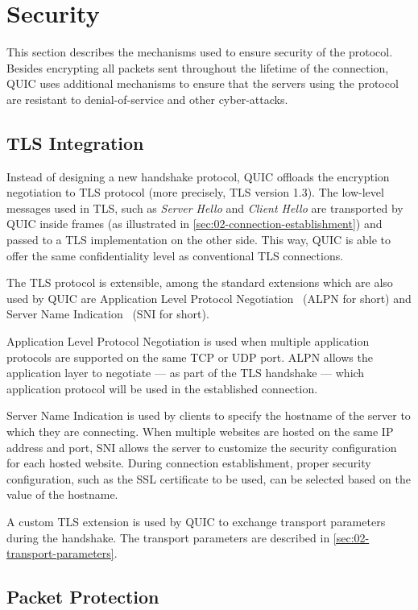 \section{Security}

This section describes the mechanisms used to ensure security of the protocol. Besides encrypting
all packets sent throughout the lifetime of the connection, QUIC uses additional mechanisms to
ensure that the servers using the protocol are resistant to denial-of-service and other
cyber-attacks.

\subsection{TLS Integration}

Instead of designing a new handshake protocol, QUIC offloads the encryption negotiation to TLS
protocol (more precisely, TLS version 1.3). The low-level messages used in TLS, such as
\textit{Server Hello} and \textit{Client Hello} are transported by QUIC inside \CRYPTO{} frames (as
illustrated in \autoref{sec:02-connection-establishment}) and passed to a TLS implementation on the
other side. This way, QUIC is able to offer the same confidentiality level as conventional TLS
connections.

The TLS protocol is extensible, among the standard extensions which are also used by QUIC are
Application Level Protocol Negotiation~\cite{rfc7301} (ALPN for short) and Server Name
Indication~\cite{rfc6066} (SNI for short).

Application Level Protocol Negotiation is used when multiple application protocols are supported on
the same TCP or UDP port. ALPN allows the application layer to negotiate --- as part of the TLS
handshake --- which application protocol will be used in the established connection.

Server Name Indication is used by clients to specify the hostname of the server to which they are
connecting. When multiple websites are hosted on the same IP address and port, SNI allows the server
to customize the security configuration for each hosted website. During connection establishment,
proper security configuration, such as the SSL certificate to be used, can be selected based on the
value of the hostname.

A custom TLS extension is used by QUIC to exchange transport parameters during the handshake. The
transport parameters are described in \autoref{sec:02-transport-parameters}.

\subsection{Packet Protection}\label{sec:02-packet-protection}

